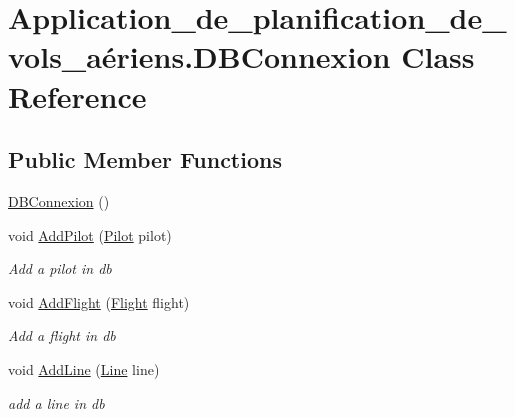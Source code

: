 \hypertarget{class_application__de__planification__de__vols__a_xC3_xA9riens_1_1_d_b_connexion}{}\section{Application\+\_\+de\+\_\+planification\+\_\+de\+\_\+vols\+\_\+aériens.\+D\+B\+Connexion Class Reference}
\label{class_application__de__planification__de__vols__a_xC3_xA9riens_1_1_d_b_connexion}
\subsection*{Public Member Functions}
\begin{DoxyCompactItemize}
\item 
\hyperlink{class_application__de__planification__de__vols__a_xC3_xA9riens_1_1_d_b_connexion_a9b5698ceb5adf9b44a745d830bf2ecaf}{D\+B\+Connexion} ()
\item 
void \hyperlink{class_application__de__planification__de__vols__a_xC3_xA9riens_1_1_d_b_connexion_aa9caece339aea7484598a37e50ca8af6}{Add\+Pilot} (\hyperlink{class_application__de__planification__de__vols__a_xC3_xA9riens_1_1_pilot}{Pilot} pilot)
\begin{DoxyCompactList}\small\item\em Add a pilot in db \end{DoxyCompactList}\item 
void \hyperlink{class_application__de__planification__de__vols__a_xC3_xA9riens_1_1_d_b_connexion_a2f4fd2e7c23839b549420fcca353984d}{Add\+Flight} (\hyperlink{class_application__de__planification__de__vols__a_xC3_xA9riens_1_1_flight}{Flight} flight)
\begin{DoxyCompactList}\small\item\em Add a flight in db \end{DoxyCompactList}\item 
void \hyperlink{class_application__de__planification__de__vols__a_xC3_xA9riens_1_1_d_b_connexion_a71d2d525cf37d0dc43f22efd89b82734}{Add\+Line} (\hyperlink{class_application__de__planification__de__vols__a_xC3_xA9riens_1_1_line}{Line} line)
\begin{DoxyCompactList}\small\item\em add a line in db \end{DoxyCompactList}\item 

\end{DoxyCompactItemize}

